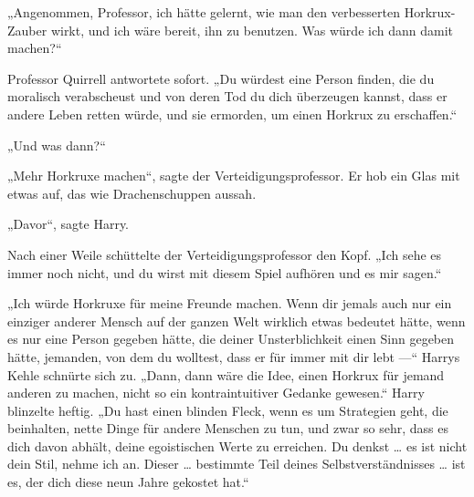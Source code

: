 „Angenommen, Professor, ich hätte gelernt, wie man den verbesserten Horkrux-Zauber wirkt, und ich wäre bereit, ihn zu benutzen. Was würde ich dann damit machen?“

Professor Quirrell antwortete sofort.
„Du würdest eine Person finden, die du moralisch verabscheust und von deren Tod du dich überzeugen kannst, dass er andere Leben retten würde, und sie ermorden, um einen Horkrux zu erschaffen.“

„Und was dann?“

„Mehr Horkruxe machen“, sagte der Verteidigungsprofessor.
Er hob ein Glas mit etwas auf, das wie Drachenschuppen aussah.

„Davor“, sagte Harry.

Nach einer Weile schüttelte der Verteidigungsprofessor den Kopf.
„Ich sehe es immer noch nicht, und du wirst mit diesem Spiel aufhören und es mir sagen.“

„Ich würde Horkruxe für meine Freunde machen. Wenn dir jemals auch nur ein einziger anderer Mensch auf der ganzen Welt wirklich etwas bedeutet hätte, wenn es nur eine Person gegeben hätte, die deiner Unsterblichkeit einen Sinn gegeben hätte, jemanden, von dem du wolltest, dass er für immer mit dir lebt —“
Harrys Kehle schnürte sich zu.
„Dann, dann wäre die Idee, einen Horkrux für jemand anderen zu machen, nicht so ein kontraintuitiver Gedanke gewesen.“
Harry blinzelte heftig.
„Du hast einen blinden Fleck, wenn es um Strategien geht, die beinhalten, nette Dinge für andere Menschen zu tun, und zwar so sehr, dass es dich davon abhält, deine egoistischen Werte zu erreichen. Du denkst … es ist nicht dein Stil, nehme ich an. Dieser … bestimmte Teil deines Selbstverständnisses … ist es, der dich diese neun Jahre gekostet hat.“

